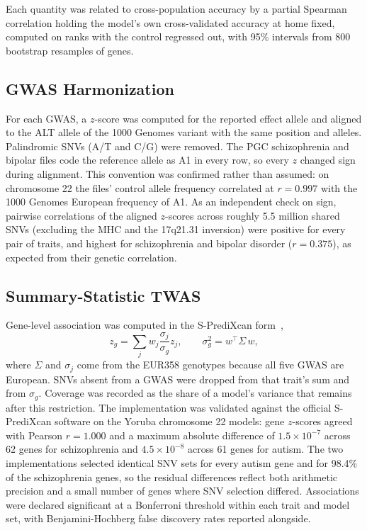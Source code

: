 \documentclass[conference]{IEEEtran}
\begin{document}
Each quantity was related to cross-population accuracy by a partial Spearman correlation holding the model's own cross-validated accuracy at home fixed, computed on ranks with the control regressed out, with 95\% intervals from 800 bootstrap resamples of genes.

\subsection{GWAS Harmonization}
For each GWAS, a $z$-score was computed for the reported effect allele and aligned to the ALT allele of the 1000 Genomes variant with the same position and alleles. Palindromic SNVs (A/T and C/G) were removed. The PGC schizophrenia and bipolar files code the reference allele as A1 in every row, so every $z$ changed sign during alignment. This convention was confirmed rather than assumed: on chromosome 22 the files' control allele frequency correlated at $r = 0.997$ with the 1000 Genomes European frequency of A1. As an independent check on sign, pairwise correlations of the aligned $z$-scores across roughly 5.5 million shared SNVs (excluding the MHC and the 17q21.31 inversion) were positive for every pair of traits, and highest for schizophrenia and bipolar disorder ($r = 0.375$), as expected from their genetic correlation.

\subsection{Summary-Statistic TWAS}
Gene-level association was computed in the S-PrediXcan form~\cite{barbeira2018},
\begin{equation}
z_g = \sum_{j} w_j \frac{\sigma_j}{\sigma_g} z_j, \qquad \sigma_g^2 = w^{\top} \Sigma\, w,
\label{eq:twas}
\end{equation}
where $\Sigma$ and $\sigma_j$ come from the EUR358 genotypes because all five GWAS are European. SNVs absent from a GWAS were dropped from that trait's sum and from $\sigma_g$. Coverage was recorded as the share of a model's variance that remains after this restriction. The implementation was validated against the official S-PrediXcan software on the Yoruba chromosome 22 models: gene $z$-scores agreed with Pearson $r = 1.000$ and a maximum absolute difference of $1.5 \times 10^{-7}$ across 62 genes for schizophrenia and $4.5 \times 10^{-8}$ across 61 genes for autism. The two implementations selected identical SNV sets for every autism gene and for 98.4\% of the schizophrenia genes, so the residual differences reflect both arithmetic precision and a small number of genes where SNV selection differed. Associations were declared significant at a Bonferroni threshold within each trait and model set, with Benjamini-Hochberg false discovery rates reported alongside.
\end{document}
